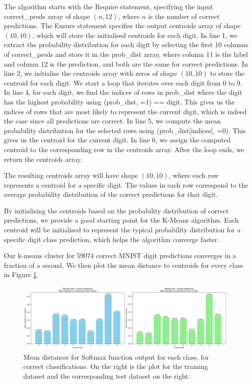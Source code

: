 The algorithm starts with the Require statement, specifying the input correct\_preds array of shape $(n, 12)$, where $n$ is the number of correct predictions.
The Ensure statement specifies the output centroids array of shape $(10, 10)$, which will store the initialised centroids for each digit.
In line 1, we extract the probability distribution for each digit by selecting the first 10 columns of correct\_preds and store it in the prob\_dist array, where column 11 is the label and column 12 is the prediction, and both are the same for correct predictions.
In line 2, we initialise the centroids array with zeros of shape $(10, 10)$ to store the centroid for each digit.
We start a loop that iterates over each digit from 0 to 9.
In line 4, for each digit, we find the indices of rows in prob\_dist where the digit has the highest probability using (prob\_dist, =1) == digit. This gives us the indices of rows that are most likely to represent the current digit, which is indeed the case since all predictions are correct.
In line 5, we compute the mean probability distribution for the selected rows using (prob\_dist[indices], =0). This gives us the centroid for the current digit.
In line 6, we assign the computed centroid to the corresponding row in the centroids array.
After the loop ends, we return the centroids array.

The resulting centroids array will have shape $(10, 10)$, where each row represents a centroid for a specific digit. The values in each row correspond to the average probability distribution of the correct predictions for that digit.

By initialising the centroids based on the probability distribution of correct predictions, we provide a good starting point for the K-Means algorithm. Each centroid will be initialised to represent the typical probability distribution for a specific digit class prediction, which helps the algorithm converge faster.

Our k-means cluster for 59074 correct MNIST digit predictions converges in a fraction of a second. We then plot the mean distance to centroids for every class in Figure \ref{fig:MNIST_Correct_Training_and_Testing_Mean_Distance_To_Centroids}.

\begin{figure}[h]
    \centering
    \includegraphics[width=0.99\textwidth]{Figures/Methods/MNIST_Correct_Training_and_Testing_Mean_Distance_To_Centroids.png}
    \caption{Mean distances for Softmax function output for each class, for correct classifications. On the right is the plot for the training dataset and the corresponding test dataset on the right.}
    \label{fig:MNIST_Correct_Training_and_Testing_Mean_Distance_To_Centroids}
\end{figure}

